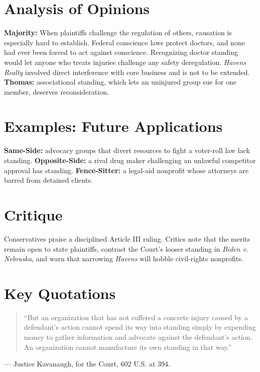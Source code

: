 \documentclass[12pt]{article}
\begin{document}
\section{Analysis of Opinions}
\textbf{Majority:} When plaintiffs challenge the regulation of others, causation is especially hard to establish. Federal conscience laws protect doctors, and none had ever been forced to act against conscience. Recognizing doctor standing would let anyone who treats injuries challenge any safety deregulation. \textit{Havens Realty} involved direct interference with core business and is not to be extended. \textbf{Thomas:} associational standing, which lets an uninjured group sue for one member, deserves reconsideration.

\section{Examples: Future Applications}
\textbf{Same-Side:} advocacy groups that divert resources to fight a voter-roll law lack standing. \textbf{Opposite-Side:} a rival drug maker challenging an unlawful competitor approval has standing. \textbf{Fence-Sitter:} a legal-aid nonprofit whose attorneys are barred from detained clients.

\section{Critique}
Conservatives praise a disciplined Article III ruling. Critics note that the merits remain open to state plaintiffs, contrast the Court's looser standing in \textit{Biden v. Nebraska}, and warn that narrowing \textit{Havens} will hobble civil-rights nonprofits.

\section{Key Quotations}
\begin{quote}
``But an organization that has not suffered a concrete injury caused by a defendant's action cannot spend its way into standing simply by expending money to gather information and advocate against the defendant's action. An organization cannot manufacture its own standing in that way.''
\end{quote}
\noindent --- Justice Kavanaugh, for the Court, 602 U.S. at 394.
\end{document}
